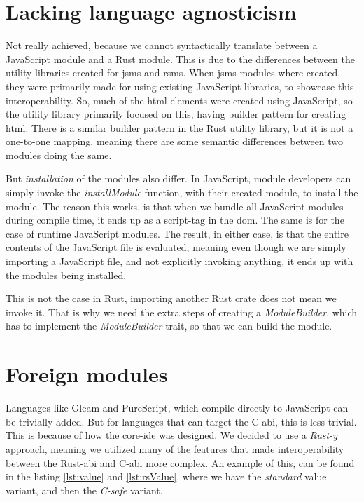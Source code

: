 \section{Lacking language agnosticism} \label{sec:lla}

Not really achieved, because we cannot syntactically translate between a
JavaScript module and a Rust module. This is due to the differences between the
utility libraries created for \gls*{jsms} and \gls*{rsms}. When \gls*{jsms} modules
where created, they were primarily made for using existing JavaScript libraries,
to showcase this interoperability. So, much of the \gls*{html} elements were
created using JavaScript, so the utility library primarily focused on this,
having builder pattern for creating \gls*{html}. There is a similar builder
pattern in the Rust utility library, but it is not a one-to-one mapping, meaning
there are some semantic differences between two modules doing the same.

But \textit{installation} of the modules also differ. In JavaScript, module
developers can simply invoke the \textit{installModule} function, with their
created module, to install the module. The reason this works, is that when we
bundle all JavaScript modules during compile time, it ends up as a script-tag in
the \gls*{dom}. The same is for the case of runtime JavaScript modules. The
result, in either case, is that the entire contents of the JavaScript file is
evaluated, meaning even though we are simply importing a JavaScript file, and
not explicitly invoking anything, it ends up with the modules being installed.

This is not the case in Rust, importing another Rust crate does not mean we
invoke it. That is why we need the extra steps of creating a
\textit{ModuleBuilder}, which has to implement the \textit{ModuleBuilder} trait,
so that we can build the module.


\section{Foreign modules} \label{sec:fm}

Languages like Gleam and PureScript, which compile directly to JavaScript can
be trivially added. But for languages that can target the C-\gls*{abi}, this is
less trivial. This is because of how the core-\gls*{ide} was designed. We decided
to use a \textit{Rust-y} approach, meaning we utilized many of the features that
made interoperability between the Rust-\gls*{abi} and C-\gls*{abi} more complex.
An example of this, can be found in the listing \ref{lst:value} and
\ref{lst:rsValue}, where we have the \textit{standard} value variant, and then
the \textit{C-safe} variant.


